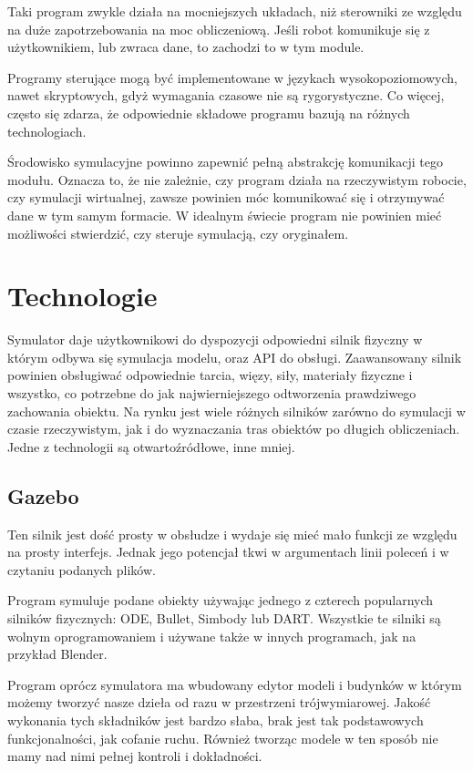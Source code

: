 Taki program zwykle działa na mocniejszych układach, niż sterowniki ze względu na duże zapotrzebowania na moc obliczeniową.
Jeśli robot komunikuje się z użytkownikiem, lub zwraca dane, to zachodzi to w tym module. 

Programy sterujące mogą być implementowane w językach wysokopoziomowych, nawet skryptowych, gdyż wymagania czasowe nie są rygorystyczne.
Co więcej, często się zdarza, że odpowiednie składowe programu bazują na różnych technologiach.

Środowisko symulacyjne powinno zapewnić pełną abstrakcję komunikacji tego modułu.
Oznacza to, że nie zależnie, czy program działa na rzeczywistym robocie, czy symulacji wirtualnej, zawsze powinien móc komunikować się i otrzymywać dane w tym samym formacie.
W idealnym świecie program nie powinien mieć możliwości stwierdzić, czy steruje symulacją, czy oryginałem.

\section{Technologie}
Symulator daje użytkownikowi do dyspozycji odpowiedni silnik fizyczny w którym odbywa się symulacja modelu, oraz API do obsługi.
Zaawansowany silnik powinien obsługiwać odpowiednie tarcia, więzy, siły, materiały fizyczne i wszystko, co potrzebne do jak najwierniejszego odtworzenia prawdziwego zachowania obiektu.
Na rynku jest wiele różnych silników zarówno do symulacji w czasie rzeczywistym, jak i do wyznaczania tras obiektów po długich obliczeniach.
Jedne z technologii są otwartoźródłowe, inne mniej.

\subsection{Gazebo}
Ten silnik jest dość prosty w obsłudze i wydaje się mieć mało funkcji ze względu na prosty interfejs.
Jednak jego potencjał tkwi w argumentach linii poleceń i w czytaniu podanych plików.

Program symuluje podane obiekty używając jednego z czterech popularnych silników fizycznych: ODE, Bullet, Simbody lub DART.
Wszystkie te silniki są wolnym oprogramowaniem i używane także w innych programach, jak na przykład Blender.

Program oprócz symulatora ma wbudowany edytor modeli i budynków w którym możemy tworzyć nasze dzieła od razu w przestrzeni trójwymiarowej.
Jakość wykonania tych składników jest bardzo słaba, brak jest tak podstawowych funkcjonalności, jak cofanie ruchu.
Również tworząc modele w ten sposób nie mamy nad nimi pełnej kontroli i dokładności.

